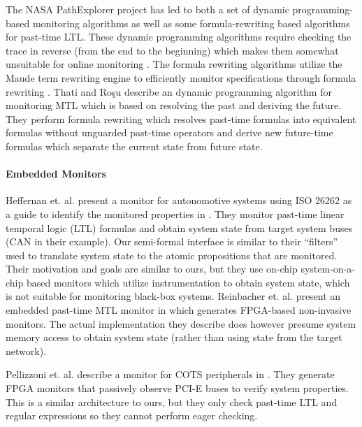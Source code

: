 The NASA PathExplorer project has led to both a set of dynamic programming-based monitoring algorithms as well as some formula-rewriting based algorithms \cite{Havelund2004} for past-time LTL. These dynamic programming algorithms require checking the trace in reverse (from the end to the beginning) which makes them somewhat unsuitable for online monitoring \cite{Havelund2002}. The formula rewriting algorithms utilize the Maude term rewriting engine to efficiently monitor specifications through formula rewriting \cite{Rosu2005}. 
%
Thati and Ro\c{s}u \cite{Thati2005} describe an dynamic programming algorithm for monitoring MTL which is based on resolving the past and deriving the future. They perform formula rewriting which resolves past-time formulas into equivalent formulas without unguarded past-time operators and derive new future-time formulas which separate the current state from future state. 

\paragraph{Embedded Monitors}
Heffernan et. al. present a monitor for autonomotive systems using ISO 26262 as a guide to identify the monitored properties in \cite{Heffernan2014}. They monitor past-time linear temporal logic (LTL) formulas and obtain system state from target system buses (CAN in their example). Our semi-formal interface is similar to their ``filters'' used to translate system state to the atomic propositions that are monitored. Their motivation and goals are similar to ours, but they use on-chip system-on-a-chip based monitors which utilize instrumentation to obtain system state, which is not suitable for monitoring black-box systems.
Reinbacher et. al. present an embedded past-time MTL monitor in \cite{Reinbacher2013} which generates FPGA-based non-invasive monitors. 
The actual implementation they describe does however presume system memory access to obtain system state (rather than using state from the target network).

Pellizzoni et. al. describe a monitor for COTS peripherals in \cite{Pellizzoni2008}. They generate FPGA monitors that passively observe PCI-E buses to verify system properties. This is a similar architecture to ours, but they only check past-time LTL and regular expressions so they cannot perform eager checking.
